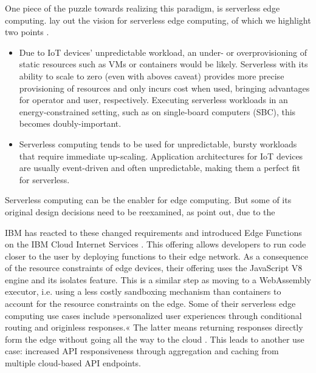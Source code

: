 One piece of the puzzle towards realizing this paradigm, is serverless edge computing. \citeauthor{Aslanpour2021} lay out the vision for serverless edge computing, of which we highlight two points \cite{Aslanpour2021}.

\begin{itemize}
    \item Due to IoT devices' unpredictable workload, an under- or overprovisioning of static resources such as VMs or containers would be likely. Serverless with its ability to scale to zero (even with aboves caveat) provides more precise provisioning of resources and only incurs cost when used, bringing advantages for operator and user, respectively. Executing serverless workloads in an energy-constrained setting, such as on single-board computers (SBC), this becomes doubly-important.
    \item Serverless computing tends to be used for unpredictable, bursty workloads that require immediate up-scaling. Application architectures for IoT devices are usually event-driven and often unpredictable, making them a perfect fit for serverless.
\end{itemize}

Serverless computing can be the enabler for edge computing. But some of its original design decisions need to be reexamined, as \citeauthor{Nastic2018} point out, due to the

\begin{quote}
\end{quote}

IBM has reacted to these changed requirements and introduced Edge Functions on the IBM Cloud Internet Services \cite{Farid2019}. This offering allows developers to run code closer to the user by deploying functions to their edge network. As a consequence of the resource constraints of edge devices, their offering uses the JavaScript V8 engine and its isolates feature. This is a similar step as moving to a WebAssembly executor, i.e. using a less costly sandboxing mechanism than containers to account for the resource constraints on the edge. Some of their serverless edge computing use cases include »personalized user experiences through conditional routing and originless responses.« The latter means returning responses directly form the edge without going all the way to the cloud \cite{IBM2021}. This leads to another use case: increased API responsiveness through aggregation and caching from multiple cloud-based API endpoints.

